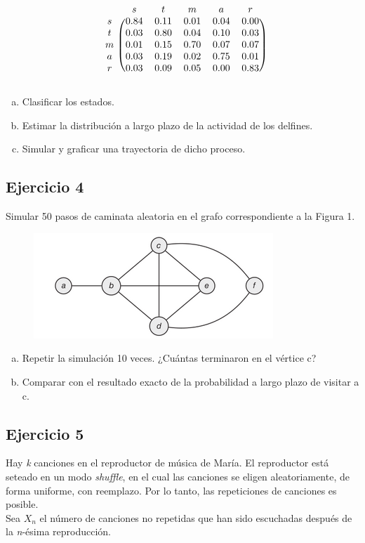 \documentclass[12pt, a4paper]{article}
\begin{document}
 \[
\begin{blockarray}{cccccc}
 & s & t & m & a & r \\
\begin{block}{c(ccccc)}
  s & 0.84 & 0.11 & 0.01 & 0.04 & 0.00 \\
  t & 0.03 & 0.80 & 0.04 & 0.10 & 0.03 \\
  m & 0.01 & 0.15 & 0.70 & 0.07 & 0.07 \\
  a & 0.03 & 0.19 & 0.02 & 0.75 & 0.01 \\
  r & 0.03 & 0.09 & 0.05 & 0.00 & 0.83 \\
\end{block}
\end{blockarray}
 \]
 
\begin{enumerate}[(a)]
	\item Clasificar los estados. 
	\item Estimar la distribución a largo plazo de la actividad de los delfines.
	\item  Simular y graficar una trayectoria de dicho proceso.
\end{enumerate}

\subsection*{Ejercicio 4}
 Simular 50 pasos de caminata aleatoria en el grafo correspondiente a la Figura 1.
 
 \begin{figure}[h]
    \centering
	\includegraphics[scale=0.6]{img3}
	\caption{}
\end{figure}

\begin{enumerate}[(a)]
	\item Repetir la simulación 10 veces. ¿Cuántas terminaron en el vértice c?
	\item  Comparar con el resultado exacto de la probabilidad a largo plazo de visitar a c.
 \end{enumerate}
 
 \subsection*{Ejercicio 5}
Hay \textit{k} canciones en el reproductor de música de María. El reproductor está seteado en un modo \textit{shuffle}, en el cual las canciones se eligen aleatoriamente, de forma uniforme, con reemplazo. Por lo tanto, las repeticiones de canciones es posible.\\
Sea $X_n$ el número de canciones no repetidas que han sido escuchadas después de la \textit{n}-ésima reproducción.
\end{document}
